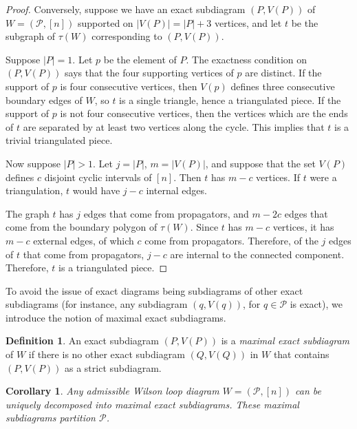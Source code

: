 \documentclass[11pt]{article}
\newcommand{\cP}{\mathcal{P}}
\newtheorem{cor}[thm]{Corollary}
\theoremstyle{remark}
\theoremstyle{definition}
\newtheorem{dfn}[thm]{Definition}
\begin{document}
\begin{proof}
Conversely, suppose we have an exact subdiagram $(P, V(P))$ of $W = (\cP, [n])$ supported on $|V(P)| = |P|+3$ vertices, and let $t$ be the subgraph of $\tau(W)$ corresponding to $(P,V(P))$.

Suppose $|P|=1$. Let $p$ be the element of $P$. The exactness condition on $(P, V(P))$ says that the four supporting vertices of $p$ are distinct.  If the support of $p$ is four consecutive vertices, then $V(p)$ defines three consecutive boundary edges of $W$, so $t$ is a single triangle, hence a triangulated piece.  If the support of $p$ is not four consecutive vertices, then the vertices which are the ends of $t$ are separated by at least two vertices along the cycle.  This implies that $t$ is a trivial triangulated piece.

Now suppose $|P|>1$.  Let $j=|P|$, $m=|V(P)|$, and 
suppose that the set $V(P)$ defines $c$ disjoint cyclic intervals of $[n]$. Then $t$ has $m-c$ vertices.  If $t$ were a triangulation, $t$ would have $j -c$ internal edges.

The graph $t$ has $j$ edges that come from propagators, and $m - 2c$ edges that come from the boundary polygon of $\tau(W)$. Since $t$ has $m-c$ vertices, it has $m-c$ external edges, of which $c$ come from propagators. Therefore, of the $j$ edges of $t$ that come from propagators, $j-c$ are internal to the connected component. Therefore, $t$ is a triangulated piece.


\end{proof}





To avoid the issue of exact diagrams being subdiagrams of other exact subdiagrams (for instance, any subdiagram $(q, V(q))$, for $q \in \cP$ is exact), we introduce the notion of maximal exact subdiagrams.

\begin{dfn}
An exact subdiagram $(P, V(P))$ is a {\em maximal exact subdiagram} of $W$ if there is no other exact subdiagram $(Q, V(Q))$ in $W$ that contains $(P,V(P))$ as a strict subdiagram.
\end{dfn}

\begin{cor} \label{uniqueproppartitioncor}
Any admissible Wilson loop diagram $W = (\cP, [n])$ can be uniquely decomposed into maximal exact subdiagrams. These maximal subdiagrams partition $\cP$.
\end{cor}
\end{document}
